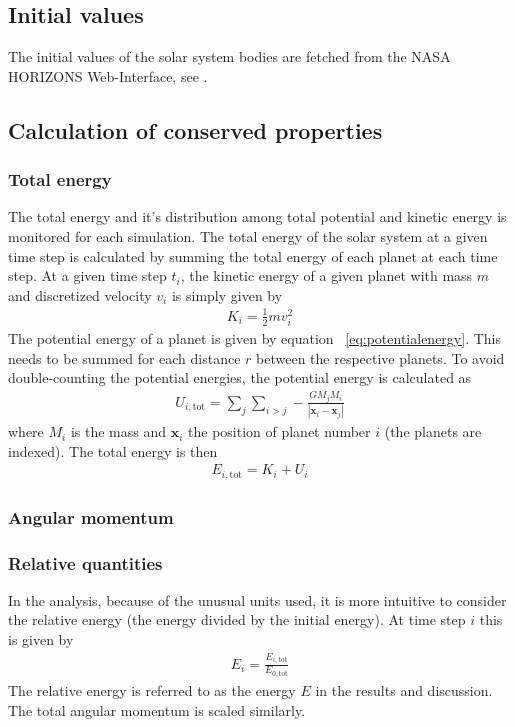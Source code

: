 \documentclass[aps,reprint]{revtex4-1}
\begin{document}
\subsection{Initial values}
The initial values of the solar system bodies are fetched from the NASA HORIZONS
Web-Interface, see \cite{nasa}.
\subsection{Calculation of conserved properties}
\subsubsection{Total energy}
The total energy and it's distribution among total potential and kinetic energy
is monitored for each simulation. The total energy of the solar system at a given time step is
calculated by summing the total energy of each planet at each time step.
At a given time step $t_i$, the kinetic energy of a given planet with mass $m$
and discretized velocity $v_i$ is simply given by
\begin{align}
  K_i = \frac{1}{2} m v_i^2
\end{align}
The potential energy of a planet is given by equation ~\ref{eq:potentialenergy}.
This needs to be summed for each distance $r$ between the respective planets. To
avoid double-counting the potential energies, the potential energy is calculated
as
\begin{align}
  U_{i, \text{tot}} = \sum_j \sum_{i > j} - \frac{G M_j M_i}{|\mathbf{x}_i - \mathbf{x}_j|}
\end{align}
where $M_i$ is the mass and $\mathbf{x}_i$ the position of planet number $i$
(the planets are indexed). The total energy is then
\begin{align}
  E_{i,\text{tot}} = K_i + U_i
\end{align}
\subsubsection{Angular momentum}
\subsubsection{Relative quantities}
In the analysis, because of the unusual units used, it is more intuitive to
consider the relative energy (the energy divided by the initial energy). At time step $i$
this is given by
\begin{align}
  E_i = \frac{E_{i,\text{tot}}}{E_{0,\text{tot}}}
\end{align}
The relative energy is referred to as the energy $E$ in the results and
discussion. The total angular momentum is scaled similarly.
\end{document}
